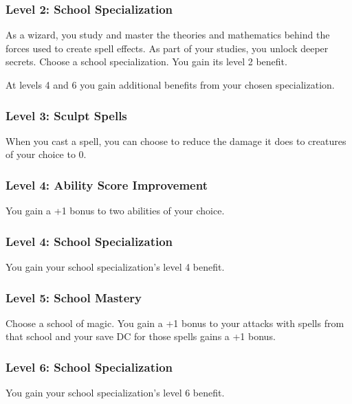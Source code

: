 \documentclass[12pt,letterpaper,twocolumn,openany,nodeprecatedcode,bg=none]{dndbook}
\begin{document}
\subsubsection{Level 2: School
Specialization}\label{level-2-school-specialization}

As a wizard, you study and master the theories and mathematics behind
the forces used to create spell effects. As part of your studies, you
unlock deeper secrets. Choose a school specialization. You gain its
level 2 benefit.

At levels 4 and 6 you gain additional benefits from your chosen
specialization.

\subsubsection{Level 3: Sculpt Spells}\label{level-3-sculpt-spells}

When you cast a spell, you can choose to reduce the damage it does to
creatures of your choice to 0.

\subsubsection{Level 4: Ability Score
Improvement}\label{level-4-ability-score-improvement}

You gain a +1 bonus to two abilities of your choice.

\subsubsection{Level 4: School
Specialization}\label{level-4-school-specialization}

You gain your school specialization's level 4 benefit.

\subsubsection{Level 5: School Mastery}\label{level-5-school-mastery}

Choose a school of magic. You gain a +1 bonus to your attacks with
spells from that school and your save DC for those spells gains a +1
bonus.

\subsubsection{Level 6: School
Specialization}\label{level-6-school-specialization}

You gain your school specialization's level 6 benefit.
\end{document}
